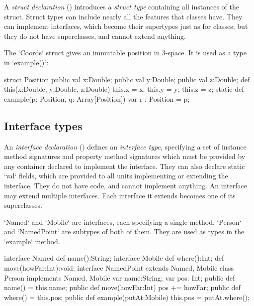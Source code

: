 A {\em struct declaration} () introduces a {\em struct type}
containing all instances of the struct.     Struct types can include nearly
all the features that classes have.  They can implement interfaces, which
become their supertypes just as for classes; but they do not have
superclasses, and cannot extend anything.  

\begin{ex}
The \xcd`Coords` struct  gives
an immutable position in 3-space.  It is used as a type in \xcd`example()`: 
\begin{xten}
struct Position {
  public val x:Double; public val y:Double; public val z:Double; 
  def this(x:Double, y:Double, z:Double) {
     this.x = x; this.y = y; this.z = z;
  }
  static def example(p: Position, q: Array[Position]) {  
     var r : Position = p;
  }
}
\end{xten}
%
\end{ex}


\subsection{Interface types}
\label{InterfaceTypes}


An {\em interface declaration} () defines an {\em
interface type}, specifying a set of instance method signatures  and property
method signatures 
which must be provided by any container declared to implement the interface.
They can also declare static \xcd`val` fields, which are provided to all
units implementing or extending the interface.   They do not have code, and
cannot implement anything.
An interface may extend multiple interfaces.  
Each interface it extends becomes one of its superclasses.


\begin{ex}
\xcd`Named` and \xcd`Mobile` are interfaces, each specifying a single method.  
\xcd`Person` and \xcd`NamedPoint` are subtypes of both of them.  They are used
as types 
in the \xcd`example` method.
\begin{xten}
interface Named {
  def name():String;
}
interface Mobile {
  def where():Int;
  def move(howFar:Int):void;
}
interface NamedPoint extends Named, Mobile {} 
class Person implements Named, Mobile {
   var name:String; var pos: Int;
   public def name() = this.name; 
   public def move(howFar:Int) { pos += howFar; }
   public def where() = this.pos;
   public def example(putAt:Mobile) {
      this.pos = putAt.where();
   }
}

\end{xten}
%
\end{ex}




